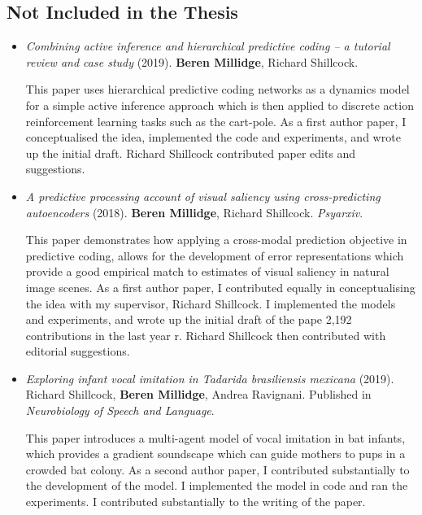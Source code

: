 \subsection{Not Included in the Thesis}
\begin{itemize}

\item \emph{Combining active inference and hierarchical predictive coding -- a tutorial review and case study} (2019). \textbf{Beren Millidge}, Richard Shillcock.

This paper uses hierarchical predictive coding networks as a dynamics model for a simple active inference approach which is then applied to discrete action reinforcement learning tasks such as the cart-pole. As a first author paper, I conceptualised the idea, implemented the code and experiments, and wrote up the initial draft. Richard Shillcock contributed paper edits and suggestions.

\item \emph{A predictive processing account of visual saliency using cross-predicting autoencoders} (2018). \textbf{Beren Millidge}, Richard Shillcock. \emph{Psyarxiv}.

This paper demonstrates how applying a cross-modal prediction objective in predictive coding, allows for the development of error representations which provide a good empirical match to estimates of visual saliency in natural image scenes. As a first author paper, I contributed equally in conceptualising the idea with my supervisor, Richard Shillcock. I implemented the models and experiments, and wrote up the initial draft of the pape 2,192 contributions in the last year r. Richard Shillcock then contributed with editorial suggestions.

\item  \emph{Exploring infant vocal imitation in Tadarida brasiliensis mexicana} (2019). Richard Shillcock, \textbf{Beren Millidge}, Andrea Ravignani. Published in \emph{Neurobiology of Speech and Language}.

This paper introduces a multi-agent model of vocal imitation in bat infants, which provides a gradient soundscape which can guide mothers to pups in a crowded bat colony. As a second author paper, I contributed substantially to the development of the model. I implemented the model in code and ran the experiments. I contributed substantially to the writing of the paper.



\end{itemize}
